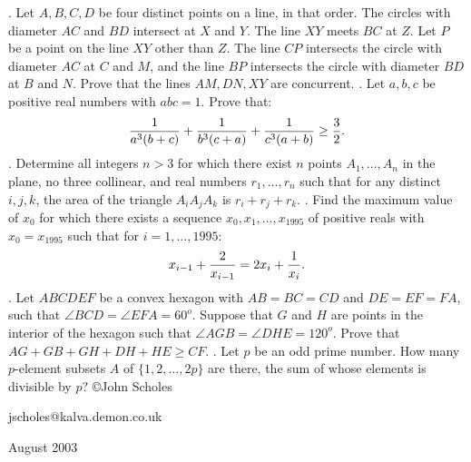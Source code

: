 \nopagenumbers
{}
\vskip 25pt
. Let $A, B, C, D$ be four distinct points on a line, in that order. The circles with diameter $AC$ and $BD$ intersect at $X$ and $Y$. The line $XY$ meets $BC$ at $Z$. Let $P$ be a point on the line $XY$ other than $Z$. The line $CP$ intersects the circle with diameter $AC$ at $C$ and $M$, and the line $BP$ intersects the circle with diameter $BD$ at $B$ and $N$. Prove that the lines $AM, DN, XY$ are concurrent.
\vskip 12pt
. Let $a, b, c$ be positive real numbers with $abc = 1$. Prove that: $${1 \over a^3(b+c)} + {1 \over b^3(c+a)} + {1 \over c^3(a+b)} \ge {3 \over 2}.$$
\vskip 12pt
. Determine all integers $n>3$ for which there exist $n$ points $A_1, \ldots , A_n$ in the plane, no three collinear, and real numbers $r_1, \ldots , r_n$ such that for any distinct $i, j, k$, the area of the triangle $A_iA_jA_k$ is $r_i+r_j+r_k$. 
\vskip 12pt
. Find the maximum value of $x_0$ for which there exists a sequence $x_0, x_1, \ldots , x_{1995}$ of positive reals with $x_0 = x_{1995}$ such that for $i = 1, \ldots , 1995$: $$x_{i-1}+{2 \over x_{i-1}} = 2x_i+{1 \over x_i}.$$
\vskip 12pt
. Let $ABCDEF$ be a convex hexagon with $AB=BC=CD$ and $DE=EF=FA$, such that $\angle BCD = \angle EFA = 60^o$. Suppose that $G$ and $H$ are points in the interior of the hexagon such that $\angle AGB = \angle DHE = 120^o$. Prove that $AG+GB+GH+DH+HE \ge CF$.
\vskip 12pt
. Let $p$ be an odd prime number. How many $p$-element subsets $A$ of $\{1, 2, \ldots , 2p\}$ are there, the sum of whose elements is divisible by $p$?
\vskip 20pt
\noindent \copyright John Scholes

\noindent jscholes@kalva.demon.co.uk

 August 2003

\bye
